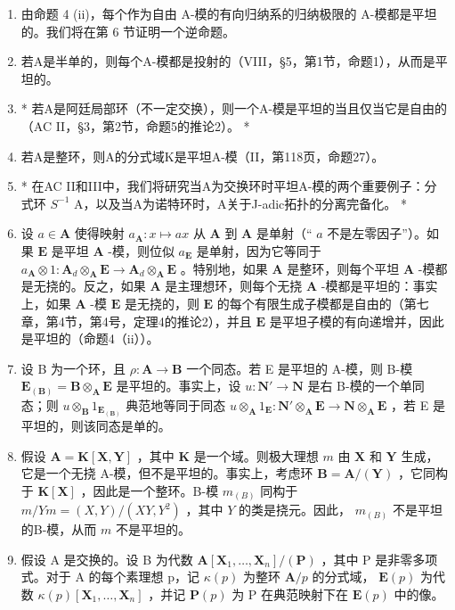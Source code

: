 \begin{enumerate}
\def\labelenumi{\arabic{enumi})}
\setcounter{enumi}{1}
\item
  由命题 4 (ii)，每个作为自由 A-模的有向归纳系的归纳极限的 A-模都是平坦的。我们将在第 6 节证明一个逆命题。
\item
  若A是半单的，则每个A-模都是投射的（VIII，§5，第1节，命题1），从而是平坦的。
\item
  * 若A是阿廷局部环（不一定交换），则一个A-模是平坦的当且仅当它是自由的（AC II，§3，第2节，命题5的推论2）。 *
\item
  若A是整环，则A的分式域K是平坦A-模（II，第118页，命题27）。
\item
  * 在AC II和III中，我们将研究当A为交换环时平坦A-模的两个重要例子：分式环 \(S^{-1}\) A，以及当A为诺特环时，A关于J-adic拓扑的分离完备化。 *
\item
  设 \(a \in \mathbf{A}\) 使得映射 \(a_{\mathbf{A}}: x \mapsto ax\) 从 \(\mathbf{A}\) 到 \(\mathbf{A}\) 是单射（“ \(a\) 不是左零因子”）。如果 \(\mathbf{E}\) 是平坦 \(\mathbf{A}\) -模，则位似 \(a_{\mathbf{E}}\) 是单射，因为它等同于 \(a_{\mathbf{A}} \otimes 1: \mathbf{A}_{d} \otimes_{\mathbf{A}} \mathbf{E} \to \mathbf{A}_{d} \otimes_{\mathbf{A}} \mathbf{E}\) 。特别地，如果 \(\mathbf{A}\) 是整环，则每个平坦 \(\mathbf{A}\) -模都是无挠的。反之，如果 \(\mathbf{A}\) 是主理想环，则每个无挠 \(\mathbf{A}\) -模都是平坦的：事实上，如果 \(\mathbf{A}\) -模 \(\mathbf{E}\) 是无挠的，则 \(\mathbf{E}\) 的每个有限生成子模都是自由的（第七章，第4节，第4号，定理4的推论2），并且 \(\mathbf{E}\) 是平坦子模的有向递增并，因此是平坦的（命题4（ii））。
\item
  设 B 为一个环，且 \(\rho: \mathbf{A} \to \mathbf{B}\) 一个同态。若 E 是平坦的 A-模，则 B-模 \(\mathbf{E}_{(\mathbf{B})} = \mathbf{B} \otimes_{\mathbf{A}} \mathbf{E}\) 是平坦的。事实上，设 \(u: \mathbf{N}' \to \mathbf{N}\) 是右 B-模的一个单同态；则 \(u \otimes_{\mathbf{B}} 1_{\mathbf{E}_{(\mathbf{B})}}\) 典范地等同于同态 \(u \otimes_{\mathbf{A}} 1_{\mathbf{E}}: \mathbf{N}' \otimes_{\mathbf{A}} \mathbf{E} \to \mathbf{N} \otimes_{\mathbf{A}} \mathbf{E}\) ，若 E 是平坦的，则该同态是单的。
\item
  假设 \(\mathbf{A} = \mathbf{K}[\mathbf{X}, \mathbf{Y}]\) ，其中 \(\mathbf{K}\) 是一个域。则极大理想 \(m\) 由 \(\mathbf{X}\) 和 \(\mathbf{Y}\) 生成，它是一个无挠 A-模，但不是平坦的。事实上，考虑环 \(\mathbf{B} = \mathbf{A}/(\mathbf{Y})\) ，它同构于 \(\mathbf{K}[\mathbf{X}]\) ，因此是一个整环。B-模 \(m_{(B)}\) 同构于 \(m/Ym = (X, Y)/(XY, Y^2)\) ，其中 \(Y\) 的类是挠元。因此， \(m_{(B)}\) 不是平坦的B-模，从而 \(m\) 不是平坦的。
\item
  假设 A 是交换的。设 B 为代数 \(\mathbf{A}[\mathbf{X}_1, \ldots, \mathbf{X}_n] / (\mathbf{P})\) ，其中 P 是非零多项式。对于 A 的每个素理想 p，记 \(\kappa(p)\) 为整环 \(\mathbf{A} / p\) 的分式域， \(\mathbf{E}(p)\) 为代数 \(\kappa(p) [\mathbf{X}_1, \ldots, \mathbf{X}_n]\) ，并记 \(\mathbf{P}(p)\) 为 P 在典范映射下在 \(\mathbf{E}(p)\) 中的像。
\end{enumerate}


